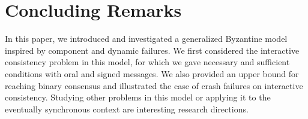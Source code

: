 
\section{Concluding Remarks}

In this paper, we introduced and investigated a generalized Byzantine model inspired by component and dynamic failures. We first considered the interactive consistency problem in this model, for which we gave necessary and sufficient conditions with oral and signed messages. We also provided an upper bound for reaching binary consensus and illustrated the case of crash failures on interactive consistency. 
Studying other problems in this model or applying it to the eventually synchronous 
context are interesting research directions. 


